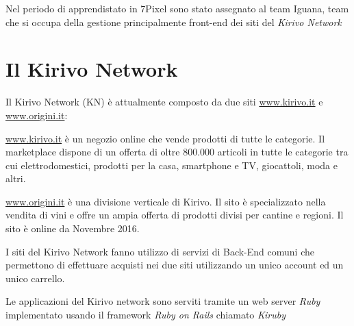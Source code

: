 


Nel periodo di apprendistato\cite{ETICHETTA} in 7Pixel sono stato assegnato al team Iguana, team che si occupa
della gestione principalmente front-end dei siti del \emph{Kirivo Network}

\section{Il Kirivo Network}
Il Kirivo Network (KN) è attualmente composto da due siti  \url{www.kirivo.it} 
e \url{www.origini.it}:

\url{www.kirivo.it} è un negozio online che vende prodotti di tutte le categorie.
Il marketplace dispone di un offerta di oltre 800.000 articoli in tutte le categorie tra cui
elettrodomestici, prodotti per la casa, smartphone e TV, giocattoli, moda e altri.

\url{www.origini.it} è una divisione verticale di Kirivo. Il sito è specializzato nella vendita
di vini e offre un ampia offerta di prodotti divisi per cantine e regioni. Il sito
è online da Novembre 2016.

I siti del Kirivo Network fanno utilizzo di servizi di Back-End comuni che permettono 
di effettuare acquisti nei due siti utilizzando un unico account ed un unico carrello.

Le applicazioni del Kirivo network sono serviti tramite un web server \emph{Ruby} implementato
usando il framework \emph{Ruby on Rails} chiamato \emph{Kiruby}

